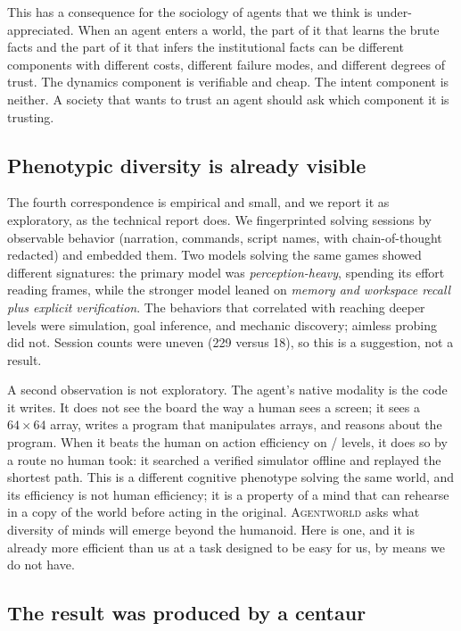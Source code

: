 \documentclass[11pt]{article}
\newcommand{\agentworld}{\textsc{Agentworld}}
\begin{document}
This has a consequence for the sociology of agents that we think is under-appreciated. When an agent
enters a world, the part of it that learns the brute facts and the part of it that infers the
institutional facts can be different components with different costs, different failure modes, and
different degrees of trust. The dynamics component is verifiable and cheap. The intent component is
neither. A society that wants to trust an agent should ask which component it is trusting.

\subsection{Phenotypic diversity is already visible}

The fourth correspondence is empirical and small, and we report it as exploratory, as the technical
report does. We fingerprinted solving sessions by observable behavior (narration, commands, script names,
with chain-of-thought redacted) and embedded them. Two models solving the same games showed different
signatures: the primary model was \emph{perception-heavy}, spending its effort reading frames, while the
stronger model leaned on \emph{memory and workspace recall plus explicit verification}. The behaviors that
correlated with reaching deeper levels were simulation, goal inference, and mechanic discovery; aimless
probing did not. Session counts were uneven (229 versus 18), so this is a suggestion, not a result.

A second observation is not exploratory. The agent's native modality is the code it writes. It does not
see the board the way a human sees a screen; it sees a $64\times64$ array, writes a program that
manipulates arrays, and reasons about the program. When it beats the human on action efficiency on
\ArcRhaeLevelsOverHuman/\ArcRhaeNLevels{} levels, it does so by a route no human took: it searched a
verified simulator offline and replayed the shortest path. This is a different cognitive phenotype
solving the same world, and its efficiency is not human efficiency; it is a property of a mind that can
rehearse in a copy of the world before acting in the original. \agentworld{} asks what diversity of minds
will emerge beyond the humanoid. Here is one, and it is already more efficient than us at a task designed
to be easy for us, by means we do not have.

\subsection{The result was produced by a centaur}
\end{document}
